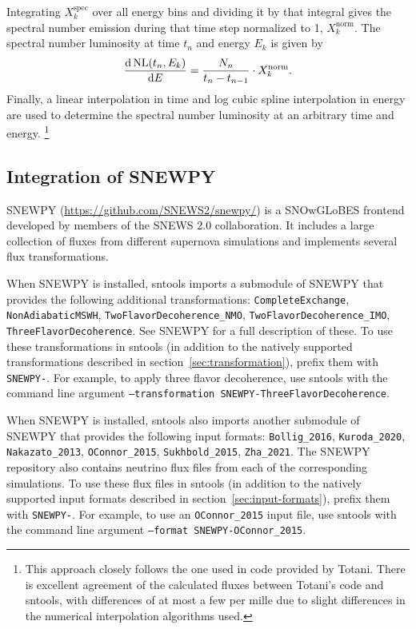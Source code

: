 \documentclass[11pt, oneside]{article}
\renewcommand{\d}{\mathrm{d}}
\newcommand{\tdiff}[3][\empty]{\ifx\empty#1
		\frac{\d\,#2}{\d #3}
	\else
		\frac{\d^{#1}\,#2}{\d #3^{#1}}
	\fi} %
\begin{document}
Integrating $X_k^\text{spec}$ over all energy bins and dividing it by that integral gives the spectral number emission during that time step normalized to 1, $X_k^\text{norm}$.
The spectral number luminosity at time $t_n$ and energy $E_k$ is given by
\begin{equation}
\tdiff{\text{NL} (t_n, E_k)}{E} = \frac{N_n}{t_n - t_{n-1}} \cdot X_k^\text{norm}.
\end{equation}
Finally, a linear interpolation in time and log cubic spline interpolation in energy are used to determine the spectral number luminosity at an arbitrary time and energy.%
\footnote{This approach closely follows the one used in code provided by Totani. There is excellent agreement of the calculated fluxes between Totani’s code and sntools, with differences of at most a few per mille due to slight differences in the numerical interpolation algorithms used.}


\subsection{Integration of SNEWPY}\label{sec:snewpy}
SNEWPY (\url{https://github.com/SNEWS2/snewpy/}) is a SNOwGLoBES frontend developed by members of the SNEWS 2.0 collaboration. It includes a large collection of fluxes from different supernova simulations and implements several flux transformations.

When SNEWPY is installed, sntools imports a submodule of SNEWPY that provides the following additional transformations:
\texttt{CompleteExchange},
\texttt{NonAdiabaticMSWH},
\texttt{TwoFlavorDecoherence\_NMO},
\texttt{TwoFlavorDecoherence\_IMO},
\texttt{ThreeFlavorDecoherence}.
See SNEWPY for a full description of these.
To use these transformations in sntools (in addition to the natively supported transformations described in section~\ref{sec:transformation}), prefix them with \texttt{SNEWPY-}. For example, to apply three flavor decoherence, use sntools with the command line argument \texttt{--transformation SNEWPY-ThreeFlavorDecoherence}.

When SNEWPY is installed, sntools also imports another submodule of SNEWPY that provides the following input formats:
\texttt{Bollig\_2016},
\texttt{Kuroda\_2020},
\texttt{Nakazato\_2013},
\texttt{OConnor\_2015},
\texttt{Sukhbold\_2015},
\texttt{Zha\_2021}.
The SNEWPY repository also contains neutrino flux files from each of the corresponding simulations.
To use these flux files in sntools (in addition to the natively supported input formats described in section~\ref{sec:input-formats}), prefix them with \texttt{SNEWPY-}. For example, to use an \texttt{OConnor\_2015} input file, use sntools with the command line argument \texttt{--format SNEWPY-OConnor\_2015}.
\end{document}
